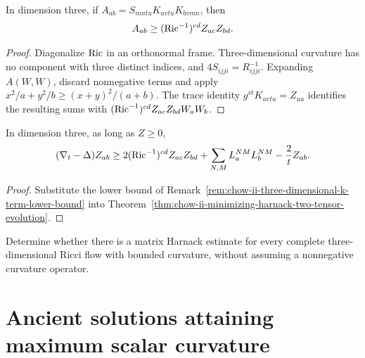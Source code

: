 \begin{remark}
\label{rem:chow-ii-three-dimensional-k-term-lower-bound}
In dimension three, if
\(A_{ab}=S_{mntu}K_{avtu}K_{bvmn}\), then
\[
A_{ab}\ge(\operatorname{Ric}^{-1})^{cd}Z_{ac}Z_{bd}.
\]
\end{remark}
\begin{proof}
Diagonalize \(\operatorname{Ric}\) in an orthonormal frame.  Three-dimensional curvature
has no component with three distinct indices, and
\(4S_{ijji}=R_{ijji}^{-1}\).  Expanding \(A(W,W)\), discard nonnegative
terms and apply
\(x^2/a+y^2/b\ge(x+y)^2/(a+b)\).  The trace identity
\(g^{vt}K_{avtu}=Z_{ua}\) identifies the resulting sums with
\((\operatorname{Ric}^{-1})^{cd}Z_{ac}Z_{bd}W_aW_b\).
\end{proof}

\begin{corollary}
\label{cor:chow-ii-three-dimensional-z-quadratic-evolution-bound}
In dimension three, as long as \(Z\ge0\),
\[
(\nabla_t-\Delta)Z_{ab}\ge
2(\operatorname{Ric}^{-1})^{cd}Z_{ac}Z_{bd}
+\sum_{N,M}L_a^{NM}L_b^{NM}-\frac2tZ_{ab}.
\]
\end{corollary}
\begin{proof}
Substitute the lower bound of
Remark~\ref{rem:chow-ii-three-dimensional-k-term-lower-bound} into
Theorem~\ref{thm:chow-ii-minimizing-harnack-two-tensor-evolution}.
\end{proof}

\begin{example}
\label{ex:chow-ii-arbitrary-three-dimensional-matrix-harnack-problem}
Determine whether there is a matrix Harnack estimate for every complete
three-dimensional Ricci flow with bounded curvature, without assuming a
nonnegative curvature operator.
\end{example}

\section{Ancient solutions attaining maximum scalar curvature}

